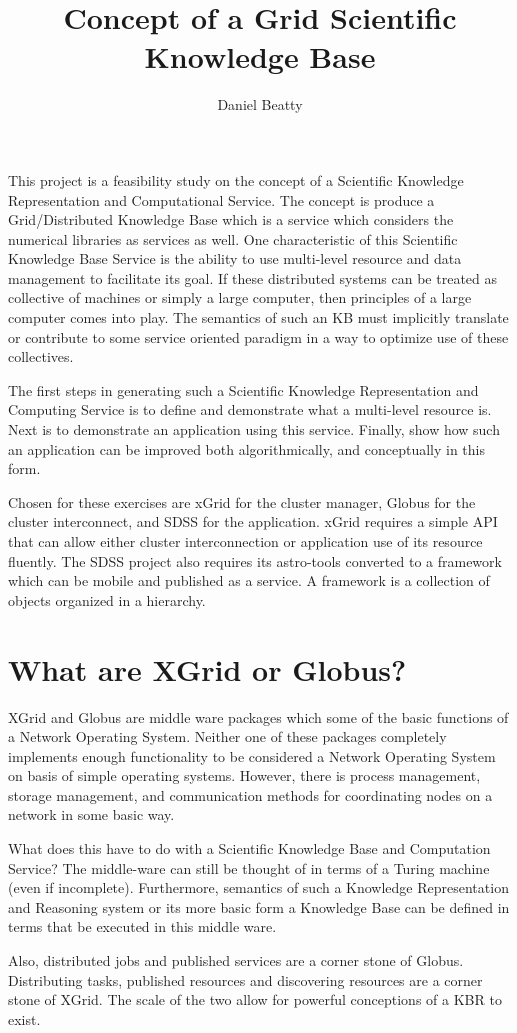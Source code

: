 \documentclass[11pt]{article}
\title{Concept of a Grid Scientific Knowledge Base}
\author{Daniel Beatty}
\begin{document}
\maketitle

This project is a feasibility study on the concept of a Scientific  Knowledge Representation and Computational Service.  
The concept is produce a Grid/Distributed Knowledge Base  which is a service which considers the numerical libraries as services as well.    One characteristic of this Scientific Knowledge Base Service is the ability to use multi-level resource and data management to facilitate its goal.  If these distributed systems can be treated as collective of machines or simply a large computer, then principles of a large computer comes into play.    The semantics of such an KB must implicitly translate or contribute to some service oriented paradigm in a way to optimize use of these collectives.  

The first steps in generating such a Scientific Knowledge Representation and Computing Service is to define and demonstrate what a multi-level resource is.  Next is to demonstrate an application using this service.  Finally, show how such an application can be improved both algorithmically, and conceptually in this form.  

Chosen for these exercises are xGrid for the cluster manager,  Globus for the cluster interconnect, and SDSS for the application.   xGrid requires a simple API that can allow either cluster interconnection or application use of its resource fluently.  The SDSS project also requires its astro-tools converted to a framework which can be mobile and published as a service.  A framework is a collection of objects organized in a hierarchy.  

\section{What are XGrid or Globus?}
XGrid and Globus are middle ware packages which some of the basic functions of a Network Operating System.  Neither one of these packages completely implements enough functionality to be considered a Network Operating System on basis of simple operating systems.  However, there is process management, storage management, and communication methods for coordinating nodes on a network in some basic way.  

What does this have to do with a Scientific Knowledge Base and Computation Service?  The middle-ware can still be thought of in terms of a Turing machine (even if incomplete).   Furthermore, semantics of such a Knowledge Representation and Reasoning system or its more basic form a Knowledge Base can be defined in terms that be executed in this middle ware.    

Also, distributed jobs and published services are a corner stone of Globus.  Distributing tasks, published resources and discovering resources are a corner stone of XGrid.    The scale of the two allow for powerful conceptions of a KBR to exist.   

 
\end{document}
